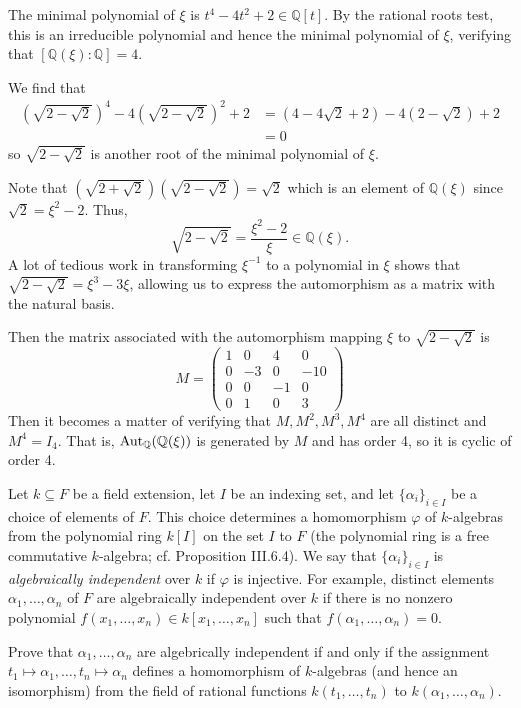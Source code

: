 \documentclass[../../master.tex]{subfiles}
\begin{document}
\begin{solution}
    The minimal polynomial of $\xi$ is $t^{4} - 4t^2 + 2 \in \mathbb{Q}[t]$.
    By the rational roots test, this is an irreducible polynomial and hence the minimal polynomial of $\xi$, verifying that $[\mathbb{Q}(\xi) : \mathbb{Q}] = 4$.

    We find that
    \begin{align*}
        \left(\sqrt{2 - \sqrt{2}}\right)^{4} - 4\left(\sqrt{2 - \sqrt{2}}\right)^2 + 2 &= (4 - 4\sqrt{2} + 2) - 4(2 - \sqrt{2}) + 2 \\
                                                                 &= 0 
    \end{align*}
    so $\sqrt{2 - \sqrt{2}}$ is another root of the minimal polynomial of $\xi$.

    Note that $(\sqrt{2 + \sqrt{2}})(\sqrt{2 - \sqrt{2}}) = \sqrt{2}$ which is an element of $\mathbb{Q}(\xi)$ since $\sqrt{2} = \xi^2 - 2$.
    Thus,
    \[
        \sqrt{2 - \sqrt{2}} = \frac{\xi^2 - 2}{\xi} \in \mathbb{Q}(\xi).
    \]
    A lot of tedious work in transforming $\xi^{-1}$ to a polynomial in $\xi$ shows that $\sqrt{2 - \sqrt{2}} = \xi^3 - 3\xi$, allowing us to express the automorphism as a matrix with the natural basis.
    
    Then the matrix associated with the automorphism mapping $\xi$ to $\sqrt{2 - \sqrt{2}}$ is
    \[
    M =
    \begin{pmatrix}
        1 & 0 & 4 & 0 \\
        0 & -3 & 0 & -10 \\
        0 & 0 & -1 & 0 \\
        0 & 1 & 0 & 3
    \end{pmatrix}
    \]
    Then it becomes a matter of verifying that $M, M^2, M^3, M^{4}$ are all distinct and $M^{4} = I_4$.
    That is, $\operatorname{Aut}_{\mathbb{Q}}(\mathbb{Q}(\xi))$ is generated by $M$ and has order 4, so it is cyclic of order 4.
\end{solution}

\begin{problem}
    Let $k \subseteq F$ be a field extension, let $I$ be an indexing set, and let $\{\alpha_i\}_{i \in I}$ be a choice of elements of $F$.
    This choice determines a homomorphism $\varphi$ of $k$-algebras from the polynomial ring $k[I]$ on the set $I$ to $F$ (the polynomial ring is a free commutative $k$-algebra; cf. Proposition III.6.4).
    We say that $\{\alpha_i\}_{i \in I}$ is \textit{algebraically independent} over $k$ if $\varphi$ is injective.
    For example, distinct elements $\alpha_1, \ldots, \alpha_n$ of $F$ are algebraically independent over $k$ if there is no nonzero polynomial $f(x_1, \ldots, x_n) \in k[x_1, \ldots, x_n]$ such that $f(\alpha_1, \ldots, \alpha_n) = 0$.

    Prove that $\alpha_1, \ldots, \alpha_n$ are algebrically independent if and only if the assignment $t_1 \mapsto \alpha_1, \ldots, t_n \mapsto \alpha_n$ defines a homomorphism of $k$-algebras (and hence an isomorphism) from the field of rational functions $k(t_1, \ldots, t_n)$ to $k(\alpha_1, \ldots, \alpha_n)$.
\end{problem}
\end{document}
